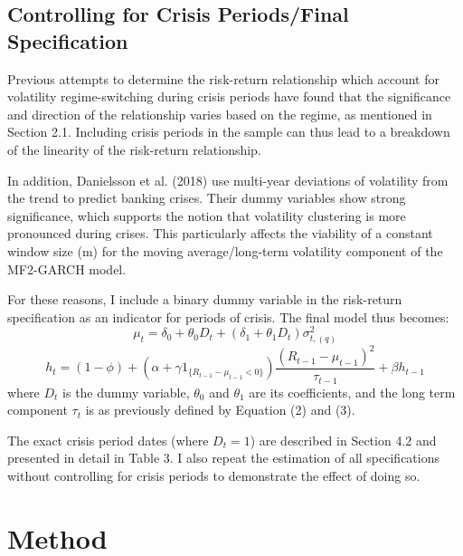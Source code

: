 \documentclass[12pt]{article}
\begin{document}
\subsection{Controlling for Crisis Periods/Final Specification}
Previous attempts to determine the risk-return relationship which account for volatility regime-switching during crisis periods have found that the significance and direction of the relationship varies based on the regime, as mentioned in Section 2.1. Including crisis periods in the sample can thus lead to a breakdown of the linearity of the risk-return relationship.\par
In addition, Danielsson et al. (2018) use multi-year deviations of volatility from the trend to predict banking crises. Their dummy variables show strong significance, which supports the notion that volatility clustering is more pronounced during crises. This particularly affects the viability of a constant window size (m) for the moving average/long-term volatility component of the MF2-GARCH model.\par
For these reasons, I include a binary dummy variable in the risk-return specification as an indicator for periods of crisis. The final model thus becomes:
\begin{equation}
\mu_t=\delta_0+\theta_0D_t+(\delta_1+\theta_1D_t)\sigma_{t,(q)}^2
\end{equation}
\begin{equation}
h_t=(1-\phi)+(\alpha+\gamma1_{\{R_{t-1}-\mu_{t-1}<0\}})\frac{(R_{t-1}-\mu_{t-1})^2}{\tau_{t-1}}+\beta h_{t-1}
\end{equation}
where $D_t$ is the dummy variable, $\theta_0$ and $\theta_1$ are its coefficients, and the long term component $\tau_t$ is as previously defined by Equation (2) and (3).\par
The exact crisis period dates (where $D_t=1$) are described in Section 4.2 and presented in detail in Table 3. I also repeat the estimation of all specifications without controlling for crisis periods to demonstrate the effect of doing so.


\section{Method}
\end{document}
